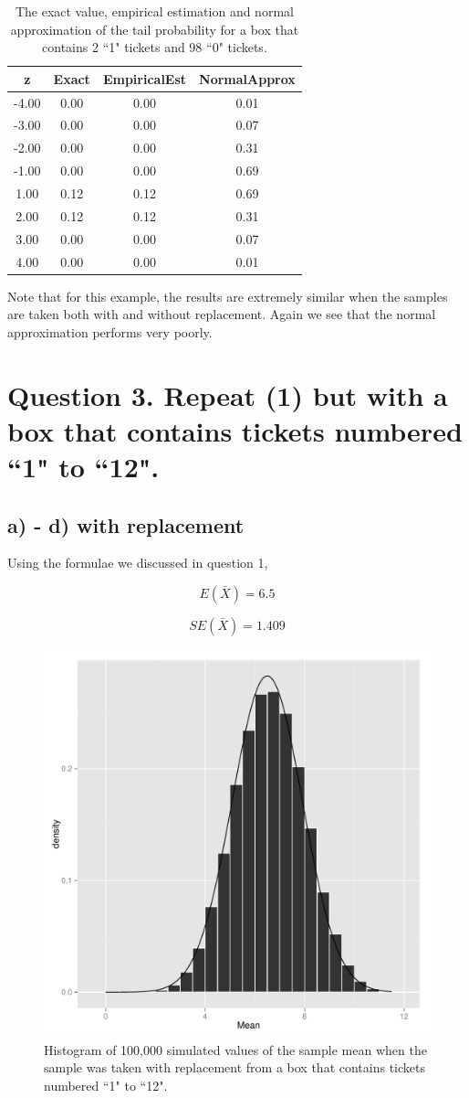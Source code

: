 \documentclass[11pt]{article}
\begin{document}
\begin{table}[H]
\centering
\begin{tabular}{|c|ccc|}
  \hline
z & Exact & EmpiricalEst & NormalApprox \\ 
  \hline
-4.00 & 0.00 & 0.00 & 0.01 \\ 
  -3.00 & 0.00 & 0.00 & 0.07 \\ 
  -2.00 & 0.00 & 0.00 & 0.31 \\ 
  -1.00 & 0.00 & 0.00 & 0.69 \\ 
  1.00 & 0.12 & 0.12 & 0.69 \\ 
  2.00 & 0.12 & 0.12 & 0.31 \\ 
  3.00 & 0.00 & 0.00 & 0.07 \\ 
  4.00 & 0.00 & 0.00 & 0.01 \\ 
   \hline
\end{tabular}
\caption{The exact value, empirical estimation and normal approximation of the tail probability for a box that contains 2 ``1" tickets and 98 ``0" tickets.} 
\end{table}


\noindent Note that for this example, the results are extremely similar when the samples are taken both with and without replacement. Again we see that the normal approximation performs very poorly.


\pagebreak

 \section*{Question 3. Repeat (1) but with a box that contains tickets numbered ``1" to ``12".}
 
 \subsection*{a) - d) with replacement}
Using the formulae we discussed in question 1,

$$E(\bar{X})= 6.5$$ 
 
 $$SE(\bar{X}) = 1.409$$

 
\begin{figure}[H]
\centering
\includegraphics[width = .5\textwidth]{histogram_3c-1.pdf}
\caption{Histogram of 100,000 simulated values of the sample mean when the sample was taken with replacement from a box that contains tickets numbered ``1" to ``12".}\label{fig:q3c}
\end{figure}
 
\end{document}
